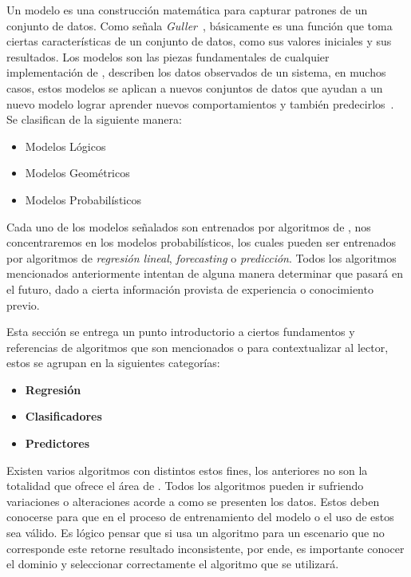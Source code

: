 Un modelo es una construcción matemática para capturar patrones de un conjunto de datos. Como señala \emph{Guller}~\MLGuller, básicamente es una función que toma ciertas características de un conjunto de datos, como sus valores iniciales y sus resultados.  Los modelos son las piezas fundamentales de cualquier implementación de \machinelearning, describen los datos observados de un sistema, en muchos casos, estos modelos se aplican a nuevos conjuntos de datos que ayudan a un nuevo modelo lograr aprender nuevos comportamientos y también predecirlos~\MLPDASunila. Se clasifican de la siguiente manera:

\begin{itemize}
\menorEspacioItemize		
 \item Modelos Lógicos
 \item Modelos Geométricos
 \item Modelos Probabilísticos
\end{itemize} 

Cada uno de los modelos señalados son entrenados por algoritmos de \machinelearning, nos concentraremos en los modelos probabilísticos, los cuales pueden ser entrenados por algoritmos de \emph{regresión lineal}, \emph{forecasting} o \emph{predicción}. Todos los algoritmos mencionados anteriormente intentan de alguna manera determinar que pasará en el futuro, dado a cierta información provista de experiencia o conocimiento previo.

Esta sección se entrega un punto introductorio a ciertos fundamentos y referencias de algoritmos que son mencionados o para contextualizar al lector, estos se agrupan en la siguientes categorías:

\begin{itemize}
	\menorEspacioItemize
	\item \textbf{Regresión}
			
			\mediocm
	\item \textbf{Clasificadores}	
			
			\mediocm
	\item \textbf{Predictores}
			
\end{itemize}
 
\uncm


Existen varios algoritmos con distintos estos fines, los anteriores no son la totalidad que ofrece el área de  \machinelearning. Todos los algoritmos pueden ir sufriendo variaciones o alteraciones acorde a como se presenten los datos. Estos deben conocerse para que en el proceso de entrenamiento del  modelo o el uso de estos sea válido. Es lógico pensar que si usa un algoritmo para un escenario que no corresponde este retorne resultado inconsistente, por ende, es importante conocer el dominio y seleccionar correctamente el algoritmo que se utilizará.


